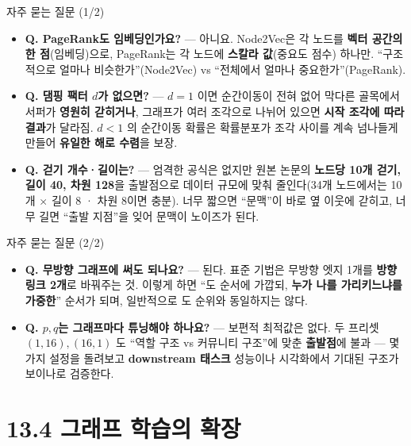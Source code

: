 \documentclass[aspectratio=169,11pt]{beamer}
\begin{document}
\begin{frame}{자주 묻는 질문 (1/2)}
  \small
  \begin{itemize}
    \item \textbf{Q. PageRank도 임베딩인가요?} --- 아니요.
      Node2Vec은 각 노드를 \textbf{벡터 공간의 한 점}(임베딩)으로,
      PageRank는 각 노드에 \textbf{스칼라 값}(중요도 점수) 하나만.
      ``구조적으로 얼마나 비슷한가''(Node2Vec) vs ``전체에서 얼마나
      중요한가''(PageRank).
    \item \textbf{Q. 댐핑 팩터 $d$가 없으면?} --- $d{=}1$ 이면
      순간이동이 전혀 없어 막다른 골목에서 서퍼가 \textbf{영원히
      갇히거나}, 그래프가 여러 조각으로 나뉘어 있으면 \textbf{시작
      조각에 따라 결과}가 달라짐. $d{<}1$ 의 순간이동 확률은
      확률분포가 조각 사이를 계속 넘나들게 만들어 \textbf{유일한
      해로 수렴}을 보장.
    \item \textbf{Q. 걷기 개수·길이는?} --- 엄격한 공식은 없지만
      원본 논문의 \textbf{노드당 10개 걷기, 길이 40, 차원 128}을
      출발점으로 데이터 규모에 맞춰 줄인다(34개 노드에서는
      10개 $\times$ 길이 8 · 차원 8이면 충분). 너무 짧으면
      ``문맥''이 바로 옆 이웃에 갇히고, 너무 길면 ``출발 지점''을
      잊어 문맥이 노이즈가 된다.
  \end{itemize}
\end{frame}

\begin{frame}{자주 묻는 질문 (2/2)}
  \small
  \begin{itemize}
    \item \textbf{Q. 무방향 그래프에 써도 되나요?} --- 된다. 표준
      기법은 무방향 엣지 1개를 \textbf{방향 링크 2개}로 바꿔주는 것.
      이렇게 하면 ``도 순서에 가깝되, \textbf{누가 나를 가리키느냐를
      가중한}'' 순서가 되며, 일반적으로 도 순위와 동일하지는 않다.
    \item \textbf{Q. $p, q$는 그래프마다 튜닝해야 하나요?} ---
      보편적 최적값은 없다. 두 프리셋 $(1,16), (16,1)$ 도 ``역할
      구조 vs 커뮤니티 구조''에 맞춘 \textbf{출발점}에 불과 ---
      몇 가지 설정을 돌려보고 \textbf{downstream 태스크} 성능이나
      시각화에서 기대된 구조가 보이나로 검증한다.
  \end{itemize}
\end{frame}

\section{13.4 그래프 학습의 확장}
\end{document}
